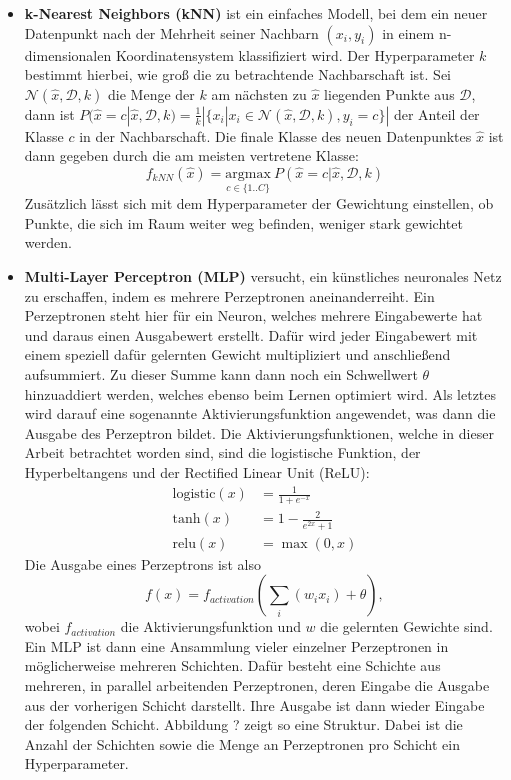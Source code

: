 \begin{itemize}

   \item \textbf{k-Nearest Neighbors (kNN)} ist ein einfaches Modell, bei dem ein neuer Datenpunkt nach der
    Mehrheit seiner Nachbarn $(x_i, y_i)$ in einem n-dimensionalen Koordinatensystem klassifiziert wird. Der
    Hyperparameter $k$ bestimmt hierbei, wie groß die zu betrachtende Nachbarschaft ist. Sei
            $\mathcal{N}(\hat{x}, \mathcal{D}, k)$
    die Menge der $k$ am nächsten zu $\hat{x}$ liegenden Punkte aus $\mathcal{D}$, dann ist
            $P(\hat{x}=c|\hat{x}, \mathcal{D}, k) = \frac{1}{k} |\{x_i | x_i \in \mathcal{N}(\hat{x}, \mathcal{D}, k), y_i=c\}|$
    der Anteil der Klasse $c$ in der Nachbarschaft. Die finale Klasse des neuen Datenpunktes $\hat{x}$ ist dann
    gegeben durch die am meisten vertretene Klasse:
    \begin{equation}
            f_{kNN}(\hat{x}) = \underset{c \in \{1..C\}}{\mathrm{argmax}}\ P(\hat{x}=c|\hat{x}, \mathcal{D}, k)
    \end{equation}
    Zusätzlich lässt sich mit dem Hyperparameter der Gewichtung einstellen, ob Punkte, die sich im Raum weiter
    weg befinden, weniger stark gewichtet werden.

   \item \textbf{Multi-Layer Perceptron (MLP)} versucht, ein künstliches neuronales Netz zu erschaffen, indem es
    mehrere Perzeptronen aneinanderreiht. Ein Perzeptronen steht hier für ein Neuron, welches mehrere Eingabewerte
    hat und daraus einen Ausgabewert erstellt. Dafür wird jeder Eingabewert mit einem speziell dafür gelernten
    Gewicht multipliziert und anschließend aufsummiert. Zu dieser Summe kann dann noch ein Schwellwert $\theta$
    hinzuaddiert werden, welches ebenso beim Lernen optimiert wird. Als letztes wird darauf eine sogenannte
    Aktivierungsfunktion angewendet, was dann die Ausgabe des Perzeptron bildet. Die Aktivierungsfunktionen,
    welche in dieser Arbeit betrachtet worden sind, sind die logistische Funktion, der Hyperbeltangens und der
    Rectified Linear Unit (ReLU):
    \begin{align}
        \text{logistic}(x) &= \frac{1}{1+e^{-x}}\\
        \text{tanh}(x)     &= 1-\frac{2}{e^{2x}+1}\\
        \text{relu}(x)     &= \max(0, x)
    \end{align}
    Die Ausgabe eines Perzeptrons ist also
    \begin{equation}
            f(x) = f_{activation}(\sum_i(w_ix_i)+\theta),
    \end{equation}
    wobei $f_{activation}$ die Aktivierungsfunktion und $w$ die gelernten Gewichte sind. Ein MLP ist dann eine
    Ansammlung vieler einzelner Perzeptronen in möglicherweise mehreren Schichten. Dafür besteht eine Schichte
    aus mehreren, in parallel arbeitenden Perzeptronen, deren Eingabe die Ausgabe aus der vorherigen Schicht
    darstellt. Ihre Ausgabe ist dann wieder Eingabe der folgenden Schicht. Abbildung ? zeigt so eine Struktur.
    Dabei ist die Anzahl der Schichten sowie die Menge an Perzeptronen pro Schicht ein Hyperparameter.


\end{itemize}
